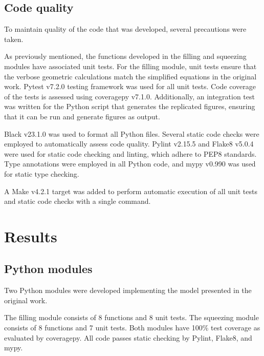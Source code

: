 \subsection{Code quality}

To maintain quality of the code that was developed, several precautions were taken.

As previously mentioned, the functions developed in the filling and squeezing modules
have associated unit tests. For the filling module, unit tests ensure that the verbose
geometric calculations match the simplified equations in the original work.
Pytest\supercite{krekel_pytest_2004} v7.2.0 testing framework was used for all unit tests.
Code coverage of the tests is assessed using coveragepy\supercite{batchelder_coveragepy_nodate} v7.1.0.
Additionally, an integration test was written for the Python script that generates the
replicated figures, ensuring that it can be run and generate figures as output.

Black\supercite{langa_black_2018} v23.1.0 was used to format all Python files. 
Several static code checks were employed to automatically assess code quality.
Pylint\supercite{thenault_pylint_2001} v2.15.5 and
Flake8\supercite{ziade_flake8_2011} v5.0.4 were used for static code checking
and linting, which adhere to PEP8\supercite{van_rossum_pep_2001} standards. Type annotations were employed
in all Python code, and mypy\supercite{lehtosalo_mypy_2012} v0.990 was used for
static type checking.

A Make\supercite{feldman_gnu_1988} v4.2.1 target was added to perform automatic execution of all
unit tests and static code checks with a single command.

\section{Results}

\subsection{Python modules}

Two Python modules were developed implementing the model presented in the original work.

The filling module consists of 8 functions and 8 unit tests. The squeezing module consists
of 8 functions and 7 unit tests. Both modules have 100\% test coverage as evaluated by
coveragepy. All code passes static checking by Pylint, Flake8, and mypy.

